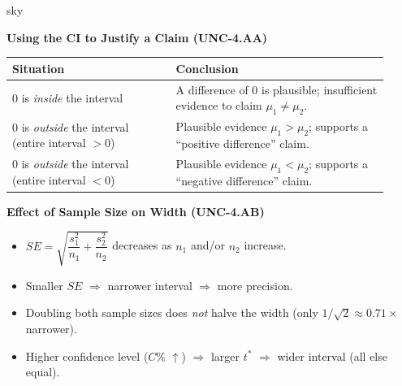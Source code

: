 \documentclass[10pt]{article}
\begin{document}
\begin{skillbox}{sky}
\begin{minipage}[t]{0.48\linewidth}
    \textbf{Using the CI to Justify a Claim (UNC-4.AA)}
    \renewcommand{\arraystretch}{1.5}
    \begin{center}
    \begin{tabular}{@{}p{0.40\linewidth} p{0.52\linewidth}@{}}
        \textbf{Situation} & \textbf{Conclusion} \\ \hline
        0 is \emph{inside} the interval & A difference of 0 is plausible; insufficient
          evidence to claim $\mu_1 \ne \mu_2$. \\
        0 is \emph{outside} the interval (entire interval $>0$) & Plausible evidence
          $\mu_1 > \mu_2$; supports a ``positive difference'' claim. \\
        0 is \emph{outside} the interval (entire interval $<0$) & Plausible evidence
          $\mu_1 < \mu_2$; supports a ``negative difference'' claim. \\
    \end{tabular}
    \end{center}
\end{minipage}
\hfill
\begin{minipage}[t]{0.48\linewidth}
    \textbf{Effect of Sample Size on Width (UNC-4.AB)}
    \begin{itemize}
        \item $SE = \sqrt{\dfrac{s_1^2}{n_1} + \dfrac{s_2^2}{n_2}}$ decreases as
              $n_1$ and/or $n_2$ increase.
        \item Smaller $SE$ $\Rightarrow$ narrower interval $\Rightarrow$ more precision.
        \item Doubling both sample sizes does \emph{not} halve the width (only
              $1/\sqrt{2} \approx 0.71\times$ narrower).
        \item Higher confidence level ($C\%$ $\uparrow$) $\Rightarrow$ larger $t^*$
              $\Rightarrow$ wider interval (all else equal).
    \end{itemize}
\end{minipage}
\end{skillbox}
\end{document}
